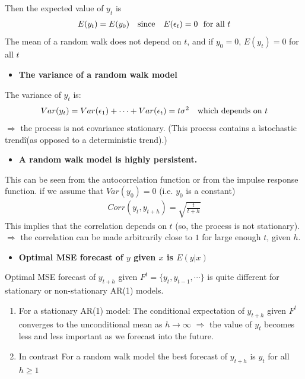 \documentclass[a4paper,twoside,11pt]{article}
\begin{document}
Then the expected value of $y_t$ is 
\begin{equation*}
\begin{aligned}
E(y_t ) = E(y_0 ) \ \ \ \textmd{since} \ \ \ E(\epsilon_t) = 0 \ \ \textmd{for all } t
\end{aligned}
\end{equation*}
The mean of a random walk does not depend on $t$, and if $y_0=0$, $E(y_t) = 0$ for all $t$
\begin{itemize}
    \item \textbf{The variance of a random walk model}
\end{itemize}
The variance of $y_t$ is:
\begin{equation*}
\begin{aligned}
Var(y_t) = Var(\epsilon_1) + \cdots + Var(\epsilon_t) = t \sigma^2 \ \ \ \textmd{which depends on} \ t
\end{aligned}
\end{equation*}
\newline
$\Rightarrow$ the process is not covariance stationary. (This process contains a ìstochastic trendî(as opposed to a deterministic trend).)
\begin{itemize}
    \item \textbf{A random walk model is highly persistent.}
\end{itemize}
This can be seen from the autocorrelation function or from the impulse
response function.
\newline
\indent if we assume that $Var(y_0) =0$ (i.e. $y_0$ is a constant)
\begin{equation*}
\begin{aligned}
Corr(y_t,y_{t+h}) = \sqrt{\frac{t}{t+h}}
\end{aligned}
\end{equation*}
This implies that the correlation depends on $t$ (so, the process is not stationary).
$\Rightarrow$ the correlation can be made arbitrarily close to $1$ for large enough $t$, given $h$. 
\begin{itemize}
    \item \textbf{Optimal MSE forecast of $y$ given $x$ is $E(y|x)$}
\end{itemize}
Optimal MSE forecast of $y_{t+h}$ given $F^t= \{ y_t, y_{t-1}, \cdots \}$ is quite different for stationary or non-stationary AR(1) models.
\begin{enumerate}
    \item For a stationary AR(1) model: 
\newline
\newline
The conditional expectation of $y_{t+h}$ given $F^t$ converges to the unconditional mean as $h \rightarrow \infty$
\newline
$\Rightarrow$ the value of $y_t$ becomes less and less important as we forecast into the future.
    \item In contrast 
\newline
\newline
For a random walk model the best forecast of $y_{t+h}$ is $y_t$ for all $h \ge 1$
\end{enumerate}
\end{document}
